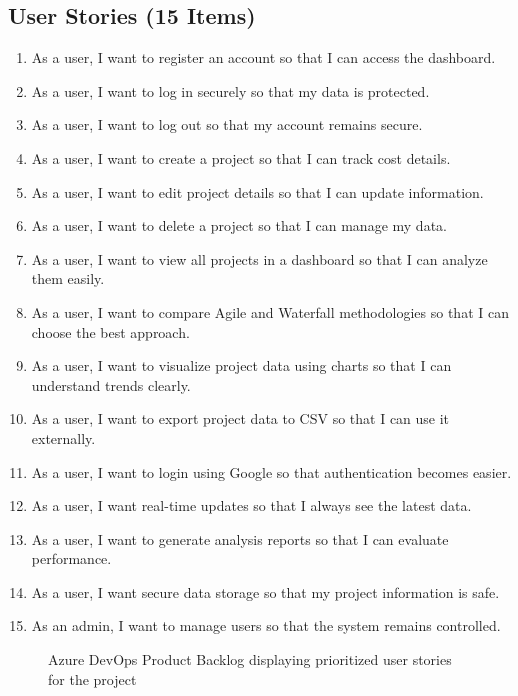 \documentclass[12pt,a4paper]{article}
\begin{document}
\subsection{User Stories (15 Items)}
\begin{enumerate}
    \item As a user, I want to register an account so that I can access the dashboard.
    \item As a user, I want to log in securely so that my data is protected.
    \item As a user, I want to log out so that my account remains secure.
    \item As a user, I want to create a project so that I can track cost details.
    \item As a user, I want to edit project details so that I can update information.
    \item As a user, I want to delete a project so that I can manage my data.
    \item As a user, I want to view all projects in a dashboard so that I can analyze them easily.
    \item As a user, I want to compare Agile and Waterfall methodologies so that I can choose the best approach.
    \item As a user, I want to visualize project data using charts so that I can understand trends clearly.
    \item As a user, I want to export project data to CSV so that I can use it externally.
    \item As a user, I want to login using Google so that authentication becomes easier.
    \item As a user, I want real-time updates so that I always see the latest data.
    \item As a user, I want to generate analysis reports so that I can evaluate performance.
    \item As a user, I want secure data storage so that my project information is safe.
    \item As an admin, I want to manage users so that the system remains controlled.
\end{enumerate}

\begin{figure}[H]
\centering
{}
\caption{Azure DevOps Product Backlog displaying prioritized user stories for the project}
\end{figure}
\end{document}
